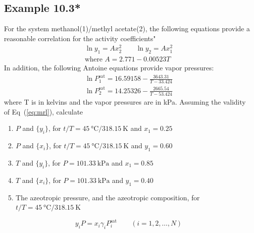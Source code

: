 \documentclass[../main.tex]{subfiles}
\begin{document}
\subsection*{Example 10.3*}
%
For the system methanol(1)/methyl acetate(2), the following equations
provide a reasonable correlation for the activity coefficients"
\begin{gather*}%
  \ln y_{1} = Ax_{2}^{2} \qquad \ln y_{2} = Ax_{1}^{2} \\
  \text{where } A = 2.771 - 0.00523 T
\end{gather*}
In addition, the following Antoine equations provide vapor pressures:
\begin{gather*}%
  \ln P_{1}^{\text{sat}} = 16.59158 - \frac{3643.31}{T - 33.424} \\
  \ln P_{2}^{\text{sat}} = 14.25326 - \frac{2665.54}{T - 53.424}
\end{gather*}
where T is in kelvins and the vapor pressures are in kPa. Assuming
the validity of Eq~(\ref{eq:mrl}), calculate
%
\begin{enumerate}[label=(\alph*)]
  \item $P$ and $\{y_{i}\}$, for $t/T =
    45~\unit{\degreeCelsius}/318.15~\unit{\kelvin}$ and $x_{1}=0.25$
  \item $P$ and $\{x_{i}\}$, for $t/T =
    45~\unit{\degreeCelsius}/318.15~\unit{\kelvin}$ and $y_{1}=0.60$
  \item $T$ and $\{y_{i}\}$, for $P = 101.33~\unit{\kilo\pascal}$ and
    $x_{1}=0.85$
  \item $T$ and $\{x_{i}\}$, for $P = 101.33~\unit{\kilo\pascal}$ and
    $y_{1}=0.40$
  \item The azeotropic pressure, and the azeotropic composition, for
    $t/T = 45~\unit{\degreeCelsius}/318.15~\unit{\kelvin}$
\end{enumerate}
%
\begin{equation*}%
  y_{i}P = x_{i}\gamma_{i}P_{i}^{\text{sat}} \qquad (i = 1,2,\dots,N)
  \label{eq:mrl}
\end{equation*}
%
\end{document}
